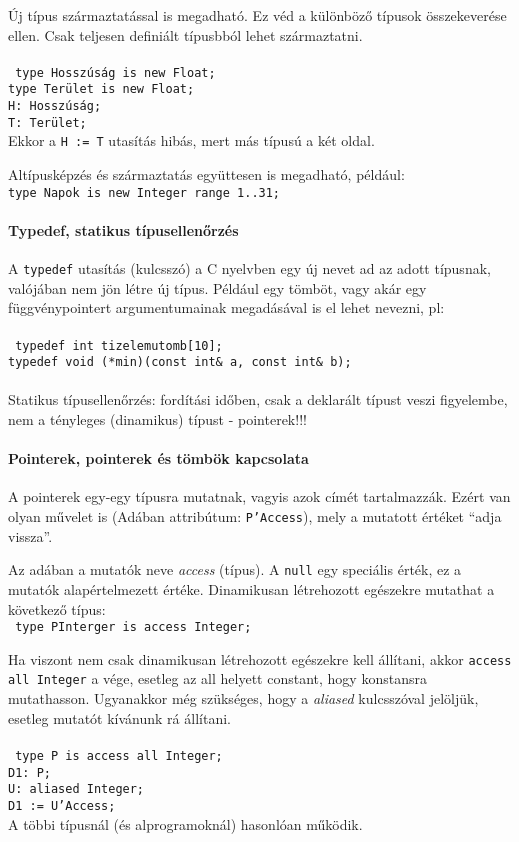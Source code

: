 \documentclass[fleqn,10pt,a4paper]{article}
\newcommand{\ut}[1]{\texttt{#1}}
\newcommand{\utt}[1]{\\\ut{#1}}
\theoremstyle{magyar}
\begin{document}
  Új típus származtatással is megadható. Ez véd a különböző típusok
  összekeverése ellen. Csak teljesen definiált típusbból lehet
  származtatni.\\
  \utt{
    type Hosszúság is new Float;\\
    type Terület is new Float;\\
    H: Hosszúság;\\
    T: Terület;}\\
  Ekkor a  \ut{H := T} utasítás hibás, mert más típusú a két oldal.
  
  Altípusképzés és származtatás együttesen is megadható, például:\\
  \ut{type Napok is new Integer range 1..31;}
  
  \paragraph{Typedef, statikus típusellenőrzés}
  A \ut{typedef} utasítás (kulcsszó) a C nyelvben egy új nevet ad az
  adott típusnak, valójában nem jön létre új típus. Például egy tömböt,
  vagy akár egy függvénypointert argumentumainak megadásával is el
  lehet nevezni, pl:\\
  \utt{
    typedef int tizelemutomb[10];\\
    typedef void (*min)(const int\& a, const int\& b);\\
  }\\
  Statikus típusellenőrzés: fordítási időben, csak a deklarált típust
  veszi figyelembe, nem a tényleges (dinamikus) típust - pointerek!!!
  
  \paragraph{Pointerek, pointerek és tömbök kapcsolata}
  A pointerek egy-egy típusra mutatnak, vagyis azok címét
  tartalmazzák. Ezért van olyan művelet is (Adában attribútum:
  \ut{P'Access}), mely a mutatott értéket ``adja vissza''.
  
  Az adában a mutatók neve \emph{access} (típus). A \ut{null} egy
  speciális érték, ez a mutatók alapértelmezett értéke. Dinamikusan
  létrehozott egészekre mutathat a következő típus:
  \utt{
    type PInterger is access Integer;\\
  }

  Ha viszont nem csak dinamikusan létrehozott egészekre kell
  állítani, akkor \ut{access all Integer} a vége, esetleg az all
  helyett constant, hogy konstansra mutathasson. Ugyanakkor még
  szükséges, hogy a \emph{aliased} kulcsszóval jelöljük, esetleg
  mutatót kívánunk rá állítani.\\
  \utt{
    type P is access all Integer;\\
    D1: P;\\
    U: aliased Integer;\\
    D1 := U'Access;\\
  }
  A többi típusnál (és
  alprogramoknál) hasonlóan működik. 
  
\end{document}
